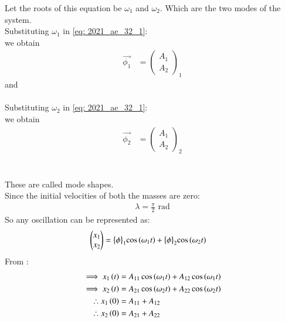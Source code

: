 \documentclass[journal,12pt,twocolumn]{IEEEtran}
\theoremstyle{remark}
\begin{document}
Let the roots of this equation be $ \omega_1$ and $ \omega_2$. Which are the two modes of the system.\\
Substituting $ \omega_1$ in \eqref{eq: 2021_ae_32_1}:\\
we obtain 
\begin{align}
 \vec{\phi_1}&= \begin{pmatrix}
A_1\\
A_2
\end{pmatrix}_1
\end{align}
and \\\\
Substituting $ \omega_2$ in \eqref{eq: 2021_ae_32_1}:\\
we obtain 
\begin{align}
 \vec{\phi_2}&=\begin{pmatrix}
A_1\\
A_2
\end{pmatrix}_2 
\end{align}
\\\\
These are called mode shapes.\\
Since the initial velocities of both the masses are zero:
\begin{align}
\lambda = \frac{\pi}{2} \text{ rad}
\end{align}
So any oscillation can be represented as:
\begin{align}
\begin{pmatrix}
x_1\\
x_2
\end{pmatrix}
&= \bigl\{ \phi \bigl\}_1\cos{\ensuremath{\left(\omega_1 t\right)}} +\bigl\{ \phi \bigl\}_2\cos{\ensuremath{\left(\omega_2 t\right)}}
\end{align}
From :
\begin{align}
\implies x_1\left(t\right)&= A_{11}\cos{\ensuremath{\left(\omega_1 t\right)}} + A_{12}\cos{\ensuremath{\left(\omega_1 t\right)}}\\
\implies x_2\left(t\right)&= A_{21}\cos{\ensuremath{\left(\omega_2 t\right)}} + A_{22}\cos{\ensuremath{\left(\omega_2 t\right)}}\\
\therefore x_1\left(0\right) &= A_{11} + A_{12}\\
\therefore x_2\left(0\right) &= A_{21} + A_{22}
\end{align}
\end{document}
